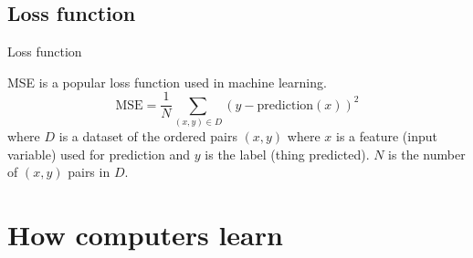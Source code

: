 \documentclass[UKenglish]{beamer}
\begin{document}
\subsection{Loss function}
\begin{frame}{Loss function}
    \begin{definition}
        MSE is a popular loss function used in machine learning.
        \begin{equation*}
            \text{MSE} = \frac{1}{N} \sum_{(x, y) \in D} (y - \text{prediction}(x))^2
        \end{equation*}
        where $D$ is a dataset of the ordered pairs $(x, y)$ where $x$ is a \alert{feature} (input variable) used for prediction and $y$ is the \alert{label} (thing predicted). $N$ is the number of $(x,y)$ pairs in $D$.
    \end{definition}
\end{frame}





\section{How computers learn}
\SectionPage
\end{document}
